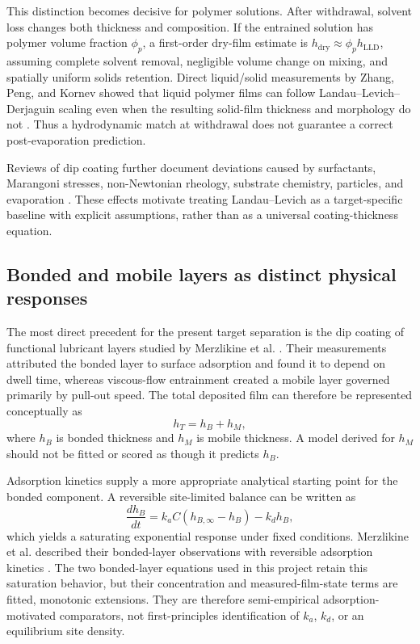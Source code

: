 \documentclass[11pt]{article}
\begin{document}
This distinction becomes decisive for polymer solutions. After withdrawal, solvent loss changes both thickness and composition. If the entrained solution has polymer volume fraction $\phi_p$, a first-order dry-film estimate is $h_{\mathrm{dry}}\approx\phi_p h_{\mathrm{LLD}}$, assuming complete solvent removal, negligible volume change on mixing, and spatially uniform solids retention. Direct liquid/solid measurements by Zhang, Peng, and Kornev showed that liquid polymer films can follow Landau--Levich--Derjaguin scaling even when the resulting solid-film thickness and morphology do not \cite{zhang2022}. Thus a hydrodynamic match at withdrawal does not guarantee a correct post-evaporation prediction.

Reviews of dip coating further document deviations caused by surfactants, Marangoni stresses, non-Newtonian rheology, substrate chemistry, particles, and evaporation \cite{rio2017}. These effects motivate treating Landau--Levich as a target-specific baseline with explicit assumptions, rather than as a universal coating-thickness equation.

\subsection{Bonded and mobile layers as distinct physical responses}
The most direct precedent for the present target separation is the dip coating of functional lubricant layers studied by Merzlikine et al. \cite{merzlikine2005}. Their measurements attributed the bonded layer to surface adsorption and found it to depend on dwell time, whereas viscous-flow entrainment created a mobile layer governed primarily by pull-out speed. The total deposited film can therefore be represented conceptually as
\begin{equation}
h_T = h_B + h_M,
\end{equation}
where $h_B$ is bonded thickness and $h_M$ is mobile thickness. A model derived for $h_M$ should not be fitted or scored as though it predicts $h_B$.

Adsorption kinetics supply a more appropriate analytical starting point for the bonded component. A reversible site-limited balance can be written as
\begin{equation}
\frac{d h_B}{dt}=k_a C\left(h_{B,\infty}-h_B\right)-k_d h_B,
\end{equation}
which yields a saturating exponential response under fixed conditions. Merzlikine et al. described their bonded-layer observations with reversible adsorption kinetics \cite{merzlikine2005}. The two bonded-layer equations used in this project retain this saturation behavior, but their concentration and measured-film-state terms are fitted, monotonic extensions. They are therefore semi-empirical adsorption-motivated comparators, not first-principles identification of $k_a$, $k_d$, or an equilibrium site density.
\end{document}
